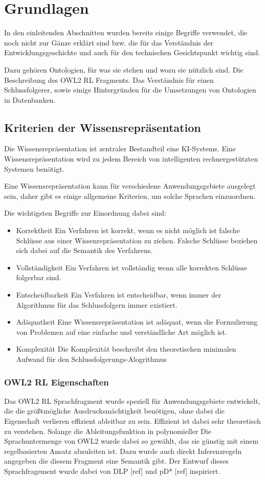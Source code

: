\chapter{Grundlagen}
In den einleitenden Abschnitten wurden bereits einige Begriffe verwendet, die noch nicht zur Gänze erklärt sind bzw. die für das Verständnis der Entwicklungsgeschichte und auch für den technischen Gesichtspunkt wichtig sind.

Dazu gehören Ontologien, für was sie stehen und wozu sie nützlich sind. Die Beschreibung des OWL2 RL Fragments. Das Verständnis für einen Schlussfolgerer, sowie einige Hintergründen für die Umsetzungen von Ontologien in Datenbanken.

\section{Kriterien der Wissensrepräsentation}

Die Wissensrepräsentation ist zentraler Bestandteil eine KI-Systems. Eine Wissensrepräsentation wird zu jedem Bereich von intelligenten rechnergestützten Systemen benötigt.

Eine Wissensrepräsentation kann für verschiedene Anwendungsgebiete ausgelegt sein, daher gibt es einige allgemeine Kriterien, um solche Sprachen einzuordnen.

Die wichtigsten Begriffe zur Einordnung dabei sind:
\begin{itemize}
  \item Korrektheit
Ein Verfahren ist korrekt, wenn es nicht möglich ist falsche Schlüsse aus einer Wissenrepräsentation zu ziehen. Falsche Schlüsse beziehen sich dabei auf die Semantik des Verfahrens.
 \item Vollständigkeit
Ein Verfahren ist vollständig wenn alle korrekten Schlüsse folgerbar sind.
 \item Entscheidbarkeit
Ein Verfahren ist entscheidbar, wenn immer der Algorithmus für das Schlussfolgern immer existiert.
 \item Adäquatheit
Eine Wissensrepräsentation ist adäquat, wenn die Formulierung von Problemen auf eine einfache und verständliche Art möglich ist.
 \item Komplexität
Die Komplexität beschreibt den theoretischen minimalen Aufwand für den Schlussfolgerungs-Alogrithmus
\end{itemize}


\subsection{OWL2 RL Eigenschaften}
Das OWL2 RL Sprachfragment wurde speziell für Anwendungsgebiete entwickelt, die die größtmögliche Ausdrucksmächtigkeit benötigen, ohne dabei die Eigenschaft verlieren effizient ableitbar zu sein. Effizient ist dabei sehr theoretisch zu verstehen. Solange die Ableitungsfunktion in polynomieller Die Sprachuntermenge von OWL2 wurde dabei so gewählt, das sie günstig mit einem regelbasierten Ansatz abzuleiten ist. Dazu wurde auch direkt Inferenzregeln angegeben die diesem Fragment eine Semantik gibt. Der Entwurf dieses Sprachfragement wurde dabei von DLP [ref] und pD* [ref] inspiriert.

